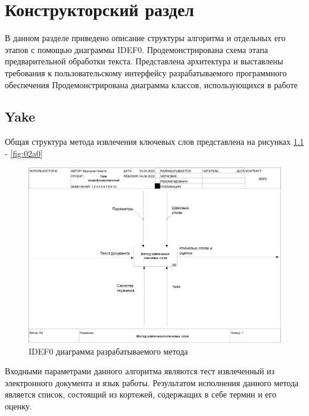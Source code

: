 \chapter{Конструкторский раздел}
В данном разделе приведено описание структуры алгоритма и отдельных его этапов с помощью диаграммы IDEF0.
Продемонстрирована схема этапа предварительной обработки текста.
Представлена архитектура и выставлены требования к пользовательскому интерфейсу разрабатываемого программного обеспечения
Продемонстрирована диаграмма классов, использующихся в работе

\section{Yake}
Общая структура метода извлечения ключевых слов представлена на рисунках \ref{fig:01a0} - \ref{fig:02a0}
\begin{figure}[!h]
	\centering
	\includegraphics[width=1\linewidth]{src/img/idef0/Yake/01_A0}
	\caption{IDEF0 диаграмма разрабатываемого метода}
	\label{fig:01a0}
\end{figure}
Входными параметрами данного алгоритма являются тест извлеченный из электронного документа и язык работы.
Результатом исполнения данного метода является список, состоящий из кортежей, содержащих в себе термин и его оценку.

